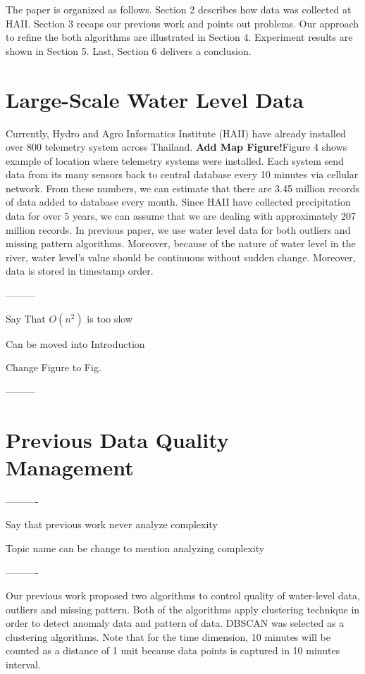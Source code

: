 \documentclass[conference]{IEEEtran}
\begin{document}
The paper is organized as follows. Section 2 describes how data was collected at HAII. Section 3 recaps our previous work and points out problems. Our approach to refine the both algorithms are illustrated in Section 4. Experiment results are shown in Section 5. Last, Section 6 delivers a conclusion.

\section{Large-Scale Water Level Data}

Currently, Hydro and Agro Informatics Institute (HAII) have already installed over 800 telemetry system across Thailand. \textbf{\color{red}Add Map Figure!}Figure 4 shows example of location where telemetry systems were installed. Each system send data from its many sensors back to central database every 10 minutes via cellular network. From these numbers, we can estimate that there are 3.45 million records of data added to database every month. Since HAII have collected precipitation data for over 5 years, we can assume that we are dealing with approximately 207 million records. In previous paper, we use water level data for both outliers and missing pattern algorithms. Moreover, because of the nature of water level in the river, water level's value should be continuous without sudden change. Moreover, data is stored in timestamp order.

---------

Say That $O(n^2)$ is too slow

Can be moved into Introduction

Change Figure to Fig.

---------

\section{Previous Data Quality Management}


----------

Say that previous work never analyze complexity

Topic name can be change to mention analyzing complexity

----------

Our previous work proposed two algorithms to control quality of water-level data, outliers and missing pattern. Both of the algorithms apply clustering technique in order to detect anomaly data and pattern of data. DBSCAN was selected as a clustering algorithms. Note that for the time dimension, 10 minutes will be counted as a distance of 1 unit because data points is captured in 10 minutes interval.
\end{document}
